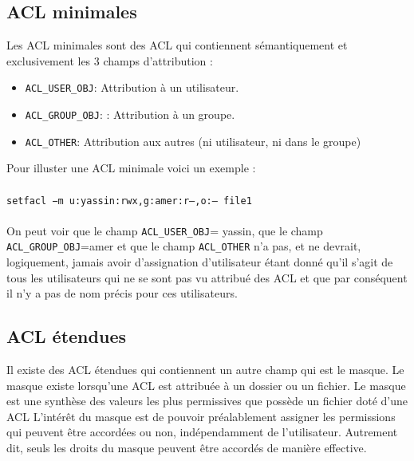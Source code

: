 \documentclass{article}
\begin{document}
\subsection{ACL minimales}
Les ACL minimales sont des ACL qui contiennent sémantiquement et exclusivement les 3 champs d'attribution : 
\begin{itemize}
\item \texttt{ACL\_USER\_OBJ}: Attribution à un utilisateur.
\item \texttt{ACL\_GROUP\_OBJ}: : Attribution à un groupe.
\item \texttt{ACL\_OTHER}: Attribution aux autres (ni utilisateur, ni dans le groupe)
\end{itemize}
Pour illuster une ACL minimale voici un exemple :\\\\
\texttt{setfacl −m u:yassin:rwx,g:amer:r--,o:-- file1}\\\\
On peut voir que le champ \texttt{ACL\_USER\_OBJ}= yassin, que le champ \texttt{ACL\_GROUP\_OBJ}=amer et que le champ \texttt{ACL\_OTHER} n'a pas, et ne devrait, logiquement, jamais avoir d'assignation d'utilisateur étant donné qu'il s'agit de tous les utilisateurs qui ne se sont pas vu attribué des ACL et que par conséquent il n'y a pas de nom précis pour ces utilisateurs.

\subsection{ACL étendues}
Il existe des ACL étendues qui contiennent un autre champ qui est le masque. Le masque existe lorsqu'une ACL est attribuée à un dossier ou un fichier. 
Le masque est une synthèse des valeurs les plus permissives que possède un fichier doté d'une ACL
L'intérêt du masque est de pouvoir préalablement assigner les permissions qui peuvent être accordées ou non, indépendamment de l'utilisateur. Autrement dit, seuls les droits du masque peuvent être accordés de manière effective.
\newpage
\end{document}
